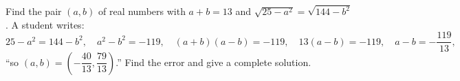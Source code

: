 Find the pair $(a,b)$ of real numbers with $a+b=13$ and $\sqrt{25-a^2}=\sqrt{144-b^2}$. A student writes:
\[
25-a^2=144-b^2,\quad a^2-b^2=-119,\quad(a+b)(a-b)=-119,\quad13(a-b)=-119,\quad a-b=-\dfrac{119}{13},
\]
``so $(a,b)=\left(-\dfrac{40}{13},\dfrac{79}{13}\right)$.'' Find the error and give a complete solution.
